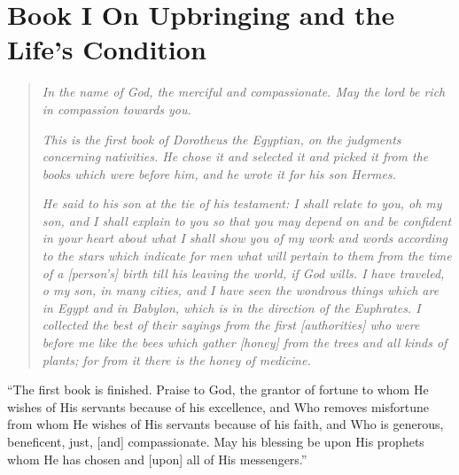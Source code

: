 \chapter[On Upbringing]{Book I On Upbringing and the Life's Condition}

\begin{quote}
\textsl{In the name of God, the merciful and compassionate. May the lord be rich in compassion towards you.}

\textsl{This is the first book of Dorotheus the Egyptian, on the judgments concerning nativities. He chose it and selected it and picked it from the books which were before him, and he wrote it for his son Hermes.}

\textsl{He said to his son at the tie of his testament: I shall relate to you, oh my son, and I shall explain to you so that you may depend on and be confident in your heart about what I shall show you of my work and words according to the stars which indicate for men what will pertain to them from the time of a [person's] birth till his leaving the world, if God wills. I have traveled, o my son, in many cities, and I have seen the wondrous things which are in Egypt and in Babylon, which is in the direction of the Euphrates. I collected the best of their sayings from the first [authorities] who were before me like the bees which gather [honey] from the trees and all kinds of plants; for from it there is the honey of medicine.}
\end{quote}





	
















``The first book is finished. Praise to God, the grantor of fortune to whom He wishes of His servants because of his excellence, and Who removes misfortune from whom He wishes of His servants because of his faith, and Who is generous, beneficent, just, [and] compassionate. May his blessing be upon His prophets whom He has chosen and [upon] all of His messengers.''
